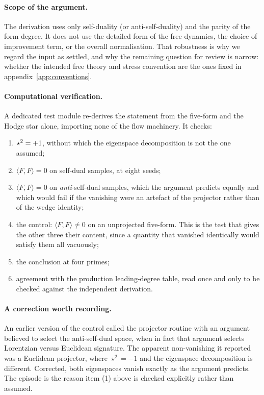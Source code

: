 \paragraph{Scope of the argument.}
The derivation uses only self-duality (or anti-self-duality) and the parity of
the form degree. It does not use the detailed form of the free dynamics, the
choice of improvement term, or the overall normalisation. That robustness is why
we regard the input as settled, and why the remaining question for review is
narrow: whether the intended free theory and stress convention are the ones fixed
in appendix~\ref{app:conventions}.

\paragraph{Computational verification.}
A dedicated test module re-derives the statement from the five-form and the
Hodge star alone, importing none of the flow machinery. It checks:
\begin{enumerate}\itemsep2pt
\item $\star^2 = +1$, without which the eigenspace decomposition is
      not the one assumed;
\item $\langle F,F\rangle = 0$ on self-dual samples, at eight seeds;
\item $\langle F,F\rangle = 0$ on \emph{anti}-self-dual samples, which the
      argument predicts equally and which would fail if the vanishing were an
      artefact of the projector rather than of the wedge identity;
\item the control: $\langle F,F\rangle \neq 0$ on an unprojected five-form. This
      is the test that gives the other three their content, since a quantity that
      vanished identically would satisfy them all vacuously;
\item the conclusion at four primes;
\item agreement with the production leading-degree table, read once and only to
      be checked against the independent derivation.
\end{enumerate}

\paragraph{A correction worth recording.}
An earlier version of the control called the projector routine with an argument
believed to select the anti-self-dual space, when in fact that argument selects
Lorentzian versus Euclidean signature. The apparent non-vanishing it reported was
a Euclidean projector, where $\star^2 = -1$ and the eigenspace decomposition is
different. Corrected, both eigenspaces vanish exactly as the argument predicts.
The episode is the reason item (1) above is checked explicitly rather than
assumed.

